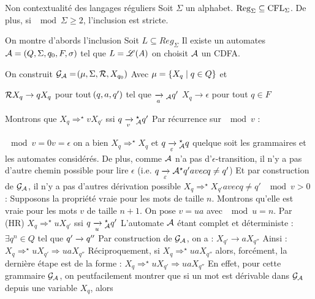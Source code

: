     
    
    \begin{theorem}{Non contextualité des langages réguliers}{}
        Soit $\Sigma$ un alphabet.
        $\Reg_\Sigma \subseteq \CFL_\Sigma$.
        De plus, si $\mod{\Sigma} \geq 2$, l'inclusion est stricte. %
    \end{theorem}
    \begin{nproof}
        On montre d'abords l'inclusion
        Soit $L \subseteq Reg_\Sigma$
        Il existe un automates $\mathcal{A} = (Q,\Sigma, q_0, F, \sigma)$ tel que $L= \mathscr{L}(A)$
        on choisit $\mathcal{A}$ un CDFA.
        
        On construit $\mathcal{G}_{\mathcal{A}} = \!\left(\mu, \Sigma, \mathcal{R}, X_{q_0}\right)$
        Avec $\mu = \left\{X_q \;\middle\vert\; q \in Q\right\}$
        et 
        \begin{enumerate}
            \itt $\mathcal{R} X_q \to q X_q$ pour tout $\!\left(q, a, q'\right)$ tel que $\lima{a}{}_\bcA q'$
            \itt $X_q \to \epsilon$ pour tout $q \in F$
        \end{enumerate}
        Montrons que $X_q \Rightarrow^\star vX_{q'}$ ssi $q \lima{v}{}_\bcA^\star q'$
        Par récurrence sur $\mod{v}$ :
        \begin{enumerate}
            \itt $\mod{v} = 0 v = \epsilon$ on a bien $X_q \Rightarrow^\star X_q$ et $q \lima{\epsilon}{}_\bcA^\star q$ quelque soit les grammaires et les automates considérés.
            De plus, comme $\mathcal{A}$ n'a pas d'$\epsilon$-transition, il n'y a pas d'autre chemin possible pour lire $\epsilon$ (i.e. $q \lima{\epsilon}{}\bcA^\star q' avec q \neq q'$)
            Et par construction de $\mathcal{G}_{\mathcal{A}}$, il n'y a pas d'autres dérivation possible $X_q \Rightarrow^\star X_{q'} avec q \neq q'$
            \itt $\mod{v} > 0$ : Supposons la propriété vraie pour les mots de taille $n$. Montrons qu'elle est vraie pour les mots $v$ de taille $n + 1$.
            On pose $v = ua$ avec $\mod{u} = n$.
            Par (HR) $X_q \Rightarrow^\star u X_{q'}$ ssi $q \lima{u}{}_\bcA^\star q'$
            L'automate $\mathcal{A}$ étant complet et déterministe : $\exists q^n \in Q$ tel que $q' \lima q''$
            Par construction de $\mathcal{G}_{\mathcal{A}}$, on a : $X_{q'} \to aX_{q''}$
            Ainsi : $X_q \Rightarrow^\star u X_{q'} \Rightarrow uaX_{q''}$
            Réciproquement, si $X_q \Rightarrow^\star uaX_{q''}$ alors, forcément, la dernière étape est de la forme : $X_q \Rightarrow^\star uX_{q'} \Rightarrow uaX_{q''}$
            En effet, pour cette grammaire $\mathcal{G}_{\mathcal{A}}$, on peutfacilement montrer que si un mot est dérivable dans $\mathcal{G}_{\mathcal{A}}$ depuis une variable $X_q$, alors

\end{enumerate}
\end{nproof}
